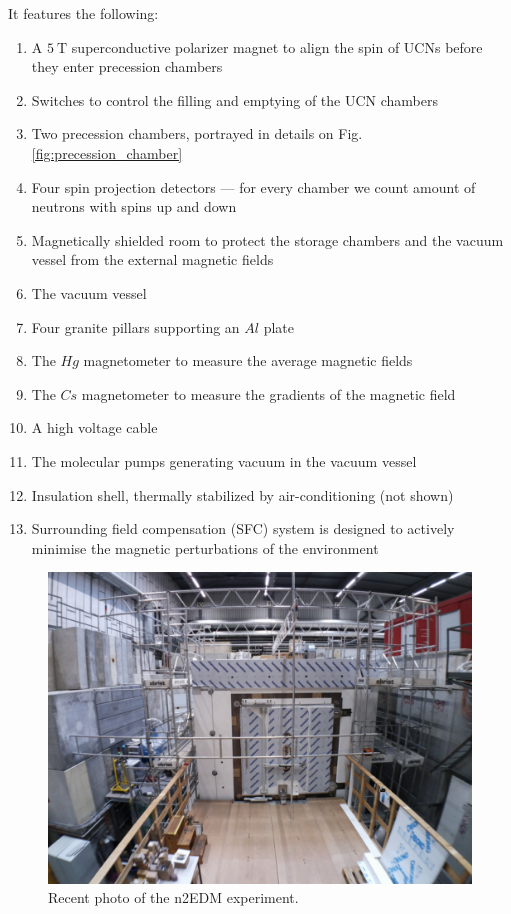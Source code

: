 It features \cite{Abel2018} the following:
\begin{enumerate}
	\item A $5\ \text{T}$ superconductive polarizer magnet to align the spin of UCNs before they enter precession chambers
	\item Switches to control the filling and emptying of the UCN chambers
	\item Two precession chambers, portrayed in details on Fig. \ref{fig:precession_chamber}
	\item Four spin projection detectors --- for every chamber we count amount of neutrons with spins up and down
	\item Magnetically shielded room to protect the storage chambers and the vacuum vessel from the external magnetic fields
	\item The vacuum vessel
	\item Four granite pillars supporting an $Al$ plate
	\item The $Hg$ magnetometer to measure the average magnetic fields
	\item The $Cs$ magnetometer to measure the gradients of the magnetic field
	\item A high voltage cable
	\item The molecular pumps generating vacuum in the vacuum vessel
	\item Insulation shell, thermally stabilized by air-conditioning (not shown)
	\item Surrounding field compensation (SFC) system is designed to actively minimise the magnetic perturbations of the environment
\end{enumerate}

\begin{figure}[h]
	\centering
	\includegraphics[width=.79\textwidth]{img/n2edm_photo}
	\caption{Recent photo of the n2EDM experiment.}
	\label{fig:n2edm_photo}
\end{figure}%